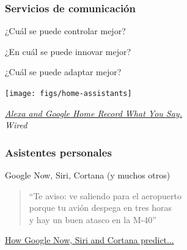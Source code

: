 \documentclass[17pt,aspectratio=169,hyperref=pdfusetitle]{beamer}
\begin{document}

\begin{frame}
\frametitle{Servicios de comunicación}

\begin{flushright}
  {\Large
    ¿Cuál se puede controlar mejor? \\

    \vspace{.5cm}
    
    ¿En cuál se puede innovar mejor? \\

    \vspace{.5cm}

    ¿Cuál se puede adaptar mejor? \\
  }
    \end{flushright}

\end{frame}

\begin{frame}[fragile]

  \begin{center}
  \texttt{[image: figs/home-assistants]}
  \end{center}

  \begin{flushright}
    {\em
      \href{https://www.wired.com/2016/12/alexa-and-google-record-your-voice/}{Alexa and Google Home Record What You Say.} \\
      Wired \\
      }
  \end{flushright}
  
\end{frame}



\begin{frame}
\frametitle{Asistentes personales}

\begin{flushright}
  Google Now, Siri, Cortana (y muchos otros)
\end{flushright}

\begin{quote}
  ``Te aviso:
  ve saliendo para el aeropuerto \\
  porque tu avión despega en tres horas \\
  y hay un buen atasco en la M-40'' \\
\end{quote}


 {\small \href{http://searchengineland.com/how-google-now-siri-cortana-predict-what-you-want-229799}{How Google Now, Siri and Cortana predict...}}
\end{frame}
\end{document}
